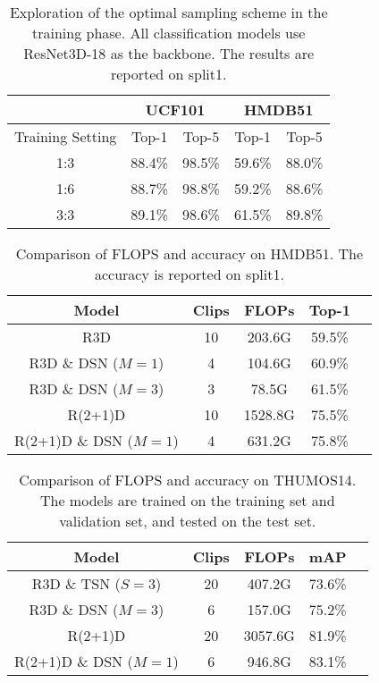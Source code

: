 \documentclass[journal]{IEEEtran}
\begin{document}
\begin{table}[t]
\centering
\caption{Exploration of the optimal sampling scheme in the training phase. All classification models use ResNet3D-18 as the backbone. The results are reported on split1.}
\begin{tabular}{ccccc}
\toprule[2pt]
&\multicolumn{2}{c}{UCF101} & \multicolumn{2}{c}{HMDB51} \\
\hline
Training Setting &Top-1&Top-5&Top-1&Top-5\\
\hline
1:3& 88.4\% & 98.5\% & 59.6\% & 88.0\%\\
\hline
1:6 & 88.7\% & 98.8\% & 59.2\% & 88.6\%\\
\hline
3:3 & 89.1\% & 98.6\% & 61.5\% & 89.8\%\\
\bottomrule[2pt]
\end{tabular}
\label{tab:train}
\end{table}

\begin{table}[h]
\centering
\caption{Comparison of FLOPS and accuracy on HMDB51. The accuracy is reported on split1.}
\begin{tabular}{ccccc}
\toprule[2pt]
Model & Clips & FLOPs & Top-1\\
\midrule
R3D &10& 203.6G &  59.5\% \\
R3D \& DSN ($M=1$)&4& 104.6G &60.9\%\\
R3D \& DSN ($M=3$)&3& 78.5G&61.5\% \\
\midrule
R(2+1)D &10& 1528.8G & 75.5\% \\
R(2+1)D \& DSN ($M=1$)&4& 631.2G& 75.8\%\\
\bottomrule[2pt]
\end{tabular}
\vspace{2mm}
\label{tab:flops_hmdb}
\end{table}

\begin{table}[h]
\centering
\caption{Comparison of FLOPS and accuracy on THUMOS14. The models are trained on the training set and validation set, and tested on the test set.}
\begin{tabular}{ccccc}
\toprule[2pt]
Model & Clips & FLOPs &  mAP\\
\midrule
R3D \& TSN ($S=3$) &20& 407.2G & 73.6\% \\
R3D \& DSN ($M=3$)&6& 157.0G& 75.2\%\\
\midrule
R(2+1)D &20& 3057.6G & 81.9\%\\
R(2+1)D \& DSN ($M=1$)&6& 946.8G& 83.1\%\\
\bottomrule[2pt]
\end{tabular}
\vspace{2mm}
\label{tab:flops_thumos}
\end{table}
\end{document}
